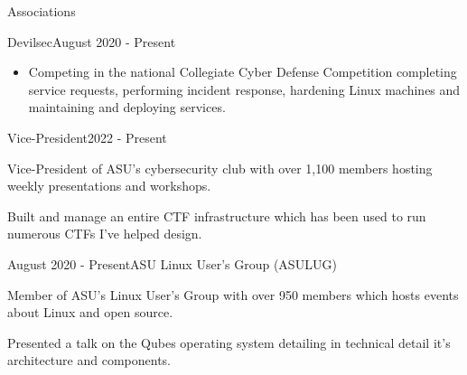 \documentclass{article}
\newlength{\tabin}
\newlength{\secsep}
\newcommand{\lineunder}{\vspace*{-8pt} \\ \hspace*{-6pt} \hrulefill \\ \vspace*{-15pt}}
\newenvironment{tabbedsection}[1]{
  \begin{list}{}{
      \setlength{\itemsep}{0pt}
      \setlength{\labelsep}{0pt}
      \setlength{\labelwidth}{0pt}
      \setlength{\leftmargin}{0pt}
      \setlength{\rightmargin}{\tabin}
      \setlength{\listparindent}{0pt}
      \setlength{\parsep}{0pt}
      \setlength{\parskip}{0pt}
      \setlength{\partopsep}{0pt}
      \setlength{\topsep}{#1}
    }
  \item[]
}{\end{list}}
\newenvironment{resume_section}[1]{
  \filbreak
  \vspace{2\secsep}
  \textsc{\color{blue}\large#1}
  \lineunder
  \begin{tabbedsection}{\secsep}
}{\end{tabbedsection}}
\newenvironment{resume_subsection}[2]{
  \textbf{\color{BlueViolet}#2} \hfill {\normalsize (#1)} \hspace{-5em}
  \begin{tabbedsection}{0.5\secsep}
  \begin{subitems}
}{\end{subitems}\end{tabbedsection}}
\newenvironment{subitems}{
  \renewcommand{\labelitemi}{-}
  \begin{itemize}
      \setlength{\labelsep}{1em}
}{\end{itemize}}
\newenvironment{resume_employer}[3]{
  \vspace{\secsep}
  \textbf{\color{BlueViolet}#1} \hfill {\normalsize (#3)} \hspace{-5em}
  \begin{tabbedsection}{0pt}
    \ifthenelse{\isempty{#2}}%
        {}%
        {\textbf{#2}}%
}{\end{tabbedsection}}
\newenvironment{resume_position}[2]{
    \vspace{\secsep}
    \textbf{#1} \hfill {\normalsize (#2)} \hspace{-2.64em}
    \begin{subitems}
}{\end{subitems}}
\begin{document}
\begin{resume_section}{Associations}
    \begin{resume_employer}{Devilsec}{}{August 2020 - Present}
        \begin{subitems}
            \item Competing in the national Collegiate Cyber Defense Competition completing service requests, performing incident response, hardening Linux machines and maintaining and deploying services.
        \end{subitems}

        \begin{resume_position}{Vice-President}{2022 - Present}
            \item Vice-President of ASU's cybersecurity club with over 1,100 members hosting weekly presentations and workshops.
            \item Built and manage an entire CTF infrastructure which has been used to run numerous CTFs I've helped design.
        \end{resume_position}
    \end{resume_employer}
    \vspace{2\secsep}
    \begin{resume_subsection}{August 2020 - Present}{ASU Linux User's Group (ASULUG)}
        \item Member of ASU's Linux User's Group with over 950 members which hosts events about Linux and open source.
        \item Presented a talk on the Qubes operating system detailing in technical detail it's architecture and components. \href{https://tayari.gg/talks/qubes-technical-introduction/}{\faExternalLinkSquare*}
    \end{resume_subsection}
\end{resume_section}
\end{document}
